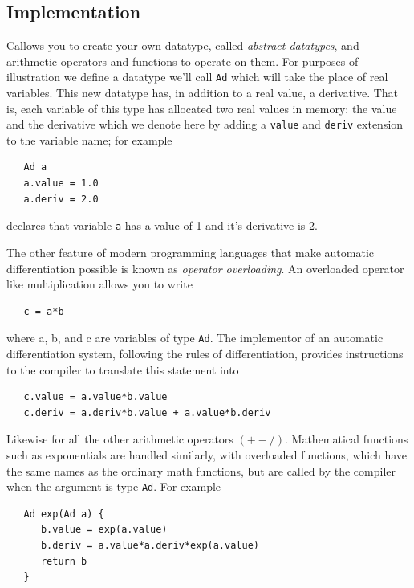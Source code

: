 \documentclass[11pt,openany,twoside]{book}
\numberwithin{equation}{section}		%
\def\Cpp{{C\nolinebreak[4]\hspace{-.05em}\raisebox{.4ex}{\tiny\bf ++}}\:}
\newcommand{\Newterm}[1]{{\em #1}}	%
\newcommand{\Code}[1]{{\small\tt #1}}
\begin{document}
\subsection{Implementation}
\Cpp allows you to create your own datatype, called
\Newterm{abstract datatypes}, and arithmetic operators and
functions to operate on them.
For purposes of illustration we define a
datatype we'll call \Code{Ad}\index{Ad@\Code{Ad} datatype}
which will take the place
of real variables. This new datatype has, in addition to
a real value, a derivative. That is, each variable of this 
type has allocated two real values in memory: the value and
the derivative which we denote here by adding a
\Code{value} and \Code{deriv} extension to the
variable name; for example
\begin{lstlisting}
   Ad a
   a.value = 1.0
   a.deriv = 2.0
\end{lstlisting}

declares that variable \Code{a} has a value of 1 and
it's derivative is 2.
\par
The other feature of modern programming
languages that make automatic differentiation possible is
known as \Newterm{operator overloading}. An overloaded
operator like multiplication allows you to write
\begin{lstlisting}
   c = a*b
\end{lstlisting}

where a, b, and c are variables of type \Code{Ad}.
The implementor of an automatic differentiation system,
following the rules of differentiation,
provides instructions to the compiler to translate this statement into
\begin{lstlisting}
   c.value = a.value*b.value
   c.deriv = a.deriv*b.value + a.value*b.deriv
\end{lstlisting}

Likewise for all the other arithmetic operators $(+-/)$.
Mathematical functions such as exponentials are handled similarly,
with overloaded functions, which have the same names
as the ordinary math functions, but are called by the compiler
when the argument is type \Code{Ad}.
For example
\begin{lstlisting}
   Ad exp(Ad a) {
      b.value = exp(a.value)
      b.deriv = a.value*a.deriv*exp(a.value)
      return b
   }
\end{lstlisting}
\end{document}
